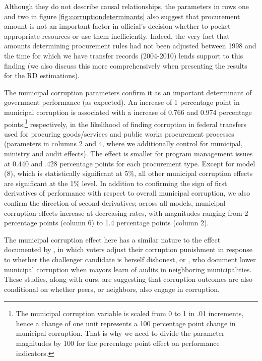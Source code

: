 \documentclass[11pt]{article}
\begin{document}
Although they do not describe causal relationships, the parameters in rows one and two in figure \ref{fig:corruptiondeterminants} also suggest that procurement amount is not an important factor in official's decision whether to pocket appropriate resources or use them inefficiently. Indeed, the very fact that amounts determining procurement rules had not been adjusted between 1998 and the time for which we have transfer records (2004-2010) lends support to this finding (we also discuss this more comprehensively when presenting the results for the RD estimations).

The municipal corruption parameters confirm it as an important determinant of government performance (as expected). An increase of 1 percentage point in municipal corruption is associated with a increase of 0.766 and 0.974 percentage points,\footnote{The municipal corruption variable is scaled from 0 to 1 in .01 increments, hence a change of one unit represents a 100 percentage point change in municipal corruption. That is why we need to divide the parameter magnitudes by 100 for the percentage point effect on performance indicators.} respectively, in the likelihood of finding corruption in federal transfers used for procuring goods/services and public works procurement processes (parameters in columns 2 and 4, where we additionally control for municipal, ministry and audit effects). The effect is smaller for program management issues at 0.440 and .428 percentage points for each procurement type. Except for model (8), which is statistically significant at 5\%, all other municipal corruption effects are significant at the 1\% level. In addition to confirming the sign of first derivatives of performance with respect to overall municipal corruption, we also confirm the direction of second derivatives; across all models, municipal corruption effects increase at decreasing rates, with magnitudes ranging from 2 percentage points (column 6) to 1.4 percentage points (column 2).

The municipal corruption effect here has a similar nature to the effect documented by \citet{ChongDoesCorruptionInformation2015}, in which voters adjust their corruption punishment in response to whether the challenger candidate is herself dishonest, or \citet{AvisGovernmentAuditsReduce2018}, who document lower municipal corruption when mayors learn of audits in neighboring municipalities. These studies, along with ours, are suggesting that corruption outcomes are also conditional on whether peers, or neighbors, also engage in corruption.
\end{document}
